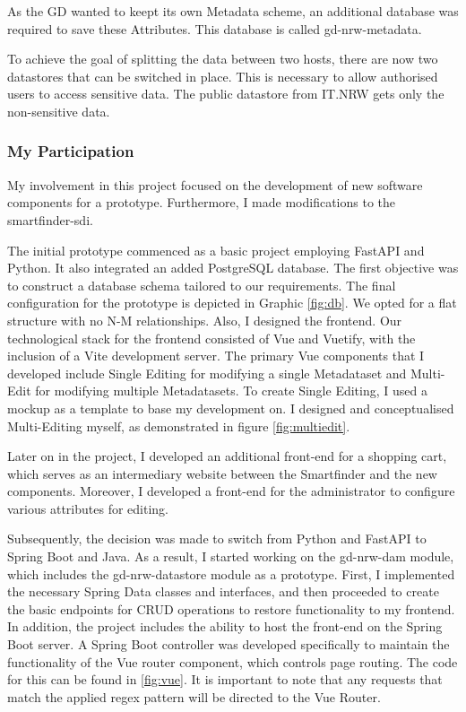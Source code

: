\documentclass[11pt, titlepage, a4paper]{article}
\begin{document}
As the GD wanted to keept its own Metadata scheme, an additional database was required to save these Attributes.  This database  is called gd-nrw-metadata. %



 To achieve the goal of splitting the data between two hosts, there are now two datastores that can be switched in place. This is necessary to allow authorised users to access sensitive data. The public datastore from IT.NRW gets only the non-sensitive data.

\subsubsection{My Participation}
My involvement in this project focused on the development of new software components for a prototype. Furthermore, I made modifications to the smartfinder-sdi.



The initial prototype commenced as a basic project employing FastAPI and Python. It also integrated an added PostgreSQL database. The first objective was to construct a database schema tailored to our requirements. The final configuration for the prototype is depicted in Graphic \ref{fig:db}. We opted for a flat structure with no N-M relationships.
Also, I designed the frontend. Our technological stack for the frontend consisted of Vue and Vuetify, with the inclusion of a Vite development server. The primary Vue components that I developed include Single Editing for modifying a single Metadataset and Multi-Edit for modifying multiple Metadatasets. To create Single Editing, I used a mockup as a template to base my development on. I designed and conceptualised Multi-Editing myself, as demonstrated in figure \ref{fig:multiedit}.

Later on in the project, I developed an additional front-end for a shopping cart, which serves as an intermediary website between the Smartfinder and the new components. Moreover, I developed a front-end for the administrator to configure various attributes for editing.




Subsequently, the decision was made to switch from Python and FastAPI to Spring Boot and Java. As a result, I started working on the gd-nrw-dam module, which includes the gd-nrw-datastore module as a prototype. First, I implemented the necessary Spring Data classes and interfaces, and then proceeded to create the basic endpoints for CRUD operations to restore functionality to my frontend. In addition, the project includes the ability to host the front-end on the Spring Boot server. A Spring Boot controller was developed specifically to maintain the functionality of the Vue router component, which controls page routing. The code for this can be found in 
\ref{fig:vue}. It is important to note that any requests that match the applied regex pattern will be directed to the Vue Router.
\end{document}
